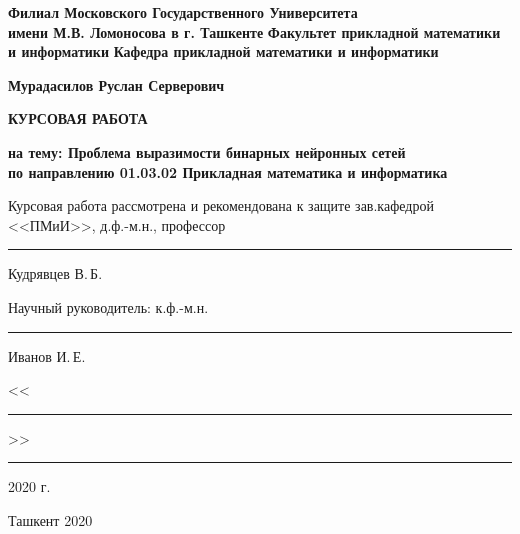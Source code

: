 \begin{titlepage}
\begin{center}
        
\textbf{Филиал Московского Государственного Университета\\
имени М.В. Ломоносова в г. Ташкенте} \vskip 0.3cm
\textbf{Факультет прикладной математики и информатики} \vskip 0.3cm
\textbf{Кафедра прикладной математики и информатики} \vskip 3cm
            
\textbf{Мурадасилов Руслан Серверович} \vskip 1cm
            
\textbf{КУРСОВАЯ РАБОТА} \vskip 1cm
            
\normalsize { \textbf{на тему: \guillemotleft Проблема выразимости бинарных нейронных сетей\guillemotright \\ \vskip 0.5cm
по направлению 01.03.02 \guillemotleft Прикладная математика и информатика\guillemotright} }
\vskip 1.5cm
\end{center}

\begin{flushleft}
Курсовая работа рассмотрена и рекомендована к защите \vskip 5pt
зав.кафедрой <<ПМиИ>>, д.ф.-м.н., профессор \rule{2.365cm}{0.5pt} Кудрявцев В.\,Б.
\end{flushleft}
\begin{flushleft}
Научный руководитель:\vskip 5pt
к.ф.-м.н. \rule{10.798cm}{0.5pt} Иванов И.\,Е.
\end{flushleft}
          
\begin{flushright}
<<\rule{1cm}{0.5pt}>>\rule{3.5cm}{0.5pt} 2020 г.
\end{flushright}
        
\vfill   
\begin{center}
Ташкент 2020
\end{center}
\end{titlepage}